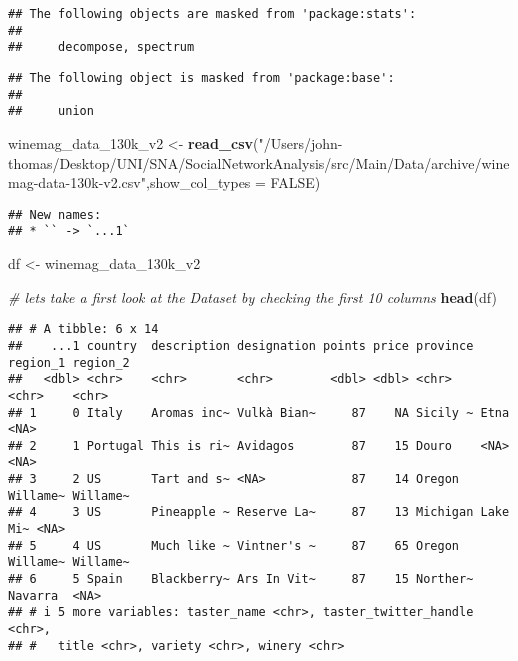 \documentclass[
]{article}
\newenvironment{Shaded}{\begin{snugshade}}{\end{snugshade}}
\newcommand{\AttributeTok}[1]{\textcolor[rgb]{0.13,0.29,0.53}{#1}}
\newcommand{\CommentTok}[1]{\textcolor[rgb]{0.56,0.35,0.01}{\textit{#1}}}
\newcommand{\ConstantTok}[1]{\textcolor[rgb]{0.56,0.35,0.01}{#1}}
\newcommand{\FunctionTok}[1]{\textcolor[rgb]{0.13,0.29,0.53}{\textbf{#1}}}
\newcommand{\NormalTok}[1]{#1}
\newcommand{\OtherTok}[1]{\textcolor[rgb]{0.56,0.35,0.01}{#1}}
\newcommand{\StringTok}[1]{\textcolor[rgb]{0.31,0.60,0.02}{#1}}
\begin{document}
\begin{verbatim}
## The following objects are masked from 'package:stats':
## 
##     decompose, spectrum
\end{verbatim}

\begin{verbatim}
## The following object is masked from 'package:base':
## 
##     union
\end{verbatim}

\begin{Shaded}
\begin{Highlighting}[]
\NormalTok{winemag\_data\_130k\_v2 }\OtherTok{\textless{}{-}} \FunctionTok{read\_csv}\NormalTok{(}\StringTok{"/Users/john{-}thomas/Desktop/UNI/SNA/SocialNetworkAnalysis/src/Main/Data/archive/winemag{-}data{-}130k{-}v2.csv"}\NormalTok{,}\AttributeTok{show\_col\_types =} \ConstantTok{FALSE}\NormalTok{)}
\end{Highlighting}
\end{Shaded}

\begin{verbatim}
## New names:
## * `` -> `...1`
\end{verbatim}

\begin{Shaded}
\begin{Highlighting}[]
\NormalTok{df }\OtherTok{\textless{}{-}}\NormalTok{ winemag\_data\_130k\_v2}
\end{Highlighting}
\end{Shaded}

\begin{Shaded}
\begin{Highlighting}[]
\CommentTok{\# lets take a first look at the Dataset by checking the first 10 columns}
\FunctionTok{head}\NormalTok{(df)}
\end{Highlighting}
\end{Shaded}

\begin{verbatim}
## # A tibble: 6 x 14
##    ...1 country  description designation points price province region_1 region_2
##   <dbl> <chr>    <chr>       <chr>        <dbl> <dbl> <chr>    <chr>    <chr>   
## 1     0 Italy    Aromas inc~ Vulkà Bian~     87    NA Sicily ~ Etna     <NA>    
## 2     1 Portugal This is ri~ Avidagos        87    15 Douro    <NA>     <NA>    
## 3     2 US       Tart and s~ <NA>            87    14 Oregon   Willame~ Willame~
## 4     3 US       Pineapple ~ Reserve La~     87    13 Michigan Lake Mi~ <NA>    
## 5     4 US       Much like ~ Vintner's ~     87    65 Oregon   Willame~ Willame~
## 6     5 Spain    Blackberry~ Ars In Vit~     87    15 Norther~ Navarra  <NA>    
## # i 5 more variables: taster_name <chr>, taster_twitter_handle <chr>,
## #   title <chr>, variety <chr>, winery <chr>
\end{verbatim}
\end{document}

